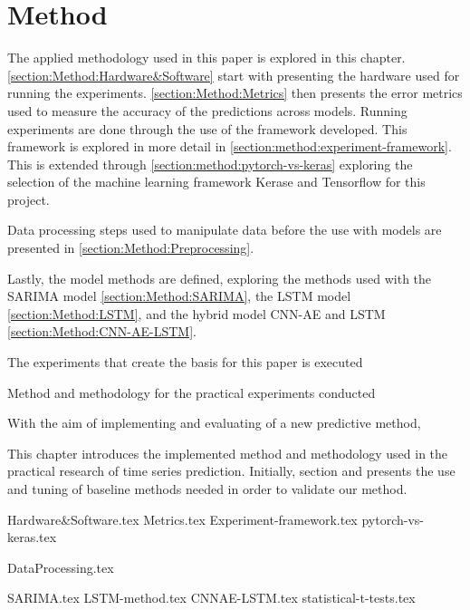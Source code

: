 \chapter{Method}
\label{section:Method}

The applied methodology used in this paper is explored in this chapter.
\cref{section:Method:Hardware&Software} start with presenting the hardware used for running the experiments.
\cref{section:Method:Metrics} then presents the error metrics used to measure the accuracy of the predictions across models.
Running experiments are done through the use of the framework developed. This framework is explored in more detail in \cref{section:method:experiment-framework}.
This is extended through \cref{section:method:pytorch-vs-keras} exploring the selection of the machine learning framework Kerase and Tensorflow for this project.

Data processing steps used to manipulate data before the use with models are presented in \cref{section:Method:Preprocessing}.

Lastly, the model methods are defined, exploring the methods used with the SARIMA model \cref{section:Method:SARIMA}, the LSTM model \cref{section:Method:LSTM},
and the hybrid model CNN-AE and LSTM \cref{section:Method:CNN-AE-LSTM}.



The experiments that create the basis for this paper is executed

Method and methodology for the practical experiments conducted


With the aim of implementing and evaluating of a new predictive method,

This chapter introduces the implemented method and methodology used in the practical research of time series prediction.
Initially, section  and
 presents the use and tuning of baseline methods needed in order to validate our method.


{Hardware&Software.tex}
{Metrics.tex}
{Experiment-framework.tex}
{pytorch-vs-keras.tex}

{DataProcessing.tex}


{SARIMA.tex}
{LSTM-method.tex}
{CNNAE-LSTM.tex}
{statistical-t-tests.tex}
